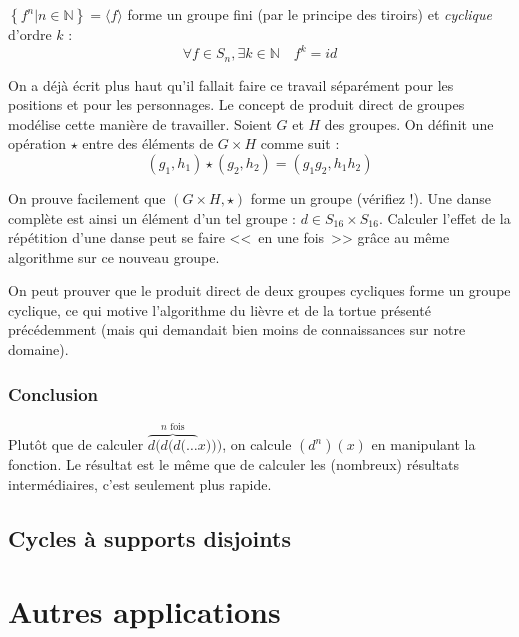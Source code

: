 \documentclass[11pt,a4paper,oneside]{book}
\begin{document}

$\left\{f^n|n \in \mathbb{N}\right\}=\langle f\rangle$ forme un groupe fini
(par le principe des tiroirs) et \emph{cyclique} d'ordre $k$ : \[
	\forall f\in S_n, \exists k\in \mathbb{N} \quad f^k=id
\]

On a déjà écrit plus haut qu'il fallait faire ce travail séparément pour les
positions et pour les personnages. Le concept de produit direct de groupes
modélise cette manière de travailler. Soient $G$ et $H$ des groupes. On définit
une opération $\star$ entre des éléments de $G\times H$ comme suit : \[
	(g_1, h_1) \star (g_2, h_2) = (g_1g_2, h_1h_2)
\]

On prouve facilement que $(G\times H, \star)$ forme un groupe (vérifiez !).
Une danse complète est ainsi un élément d'un tel groupe :
$d\in S_{16}\times S_{16}$.
Calculer l'effet de la répétition d'une danse peut se faire <<~en une fois~>>
grâce au même algorithme sur ce nouveau groupe.

On peut prouver que le produit direct de deux groupes cycliques forme un groupe
cyclique, ce qui motive l'algorithme du lièvre et de la tortue présenté
précédemment (mais qui demandait bien moins de connaissances sur notre domaine).


\subsubsection{Conclusion}
Plutôt que de calculer $\overbrace{d(d(d(\dots}^\text{$n$ fois} x)))$,
on calcule $\left(d^n\right)(x)$ en manipulant la fonction. Le résultat est le
même que de calculer les (nombreux) résultats intermédiaires, c'est seulement
plus rapide.

\subsection{Cycles à supports disjoints}


\section{Autres applications} %
\end{document}
